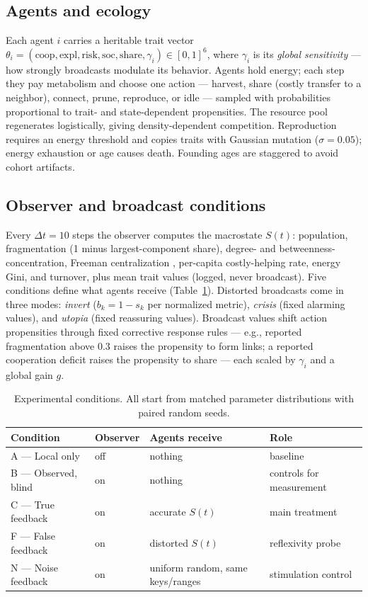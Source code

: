 \documentclass[10pt]{article}
\begin{document}
\subsection{Agents and ecology}
Each agent $i$ carries a heritable trait vector
$\theta_i=(\mathrm{coop},\mathrm{expl},\mathrm{risk},\mathrm{soc},
\mathrm{share},\gamma_i)\in[0,1]^6$, where $\gamma_i$ is its
\emph{global sensitivity} --- how strongly broadcasts modulate its behavior.
Agents hold energy; each step they pay metabolism and choose one action ---
harvest, share (costly transfer to a neighbor), connect, prune, reproduce, or
idle --- sampled with probabilities proportional to trait- and state-dependent
propensities. The resource pool regenerates logistically, giving
density-dependent competition. Reproduction requires an energy threshold and
copies traits with Gaussian mutation ($\sigma=0.05$); energy exhaustion or age
causes death. Founding ages are staggered to avoid cohort artifacts.

\subsection{Observer and broadcast conditions}
Every $\Delta t=10$ steps the observer computes the macrostate $S(t)$:
population, fragmentation (1 minus largest-component share), degree- and
betweenness-concentration, Freeman centralization \cite{freeman1978centrality},
per-capita costly-helping rate, energy Gini, and turnover, plus mean trait
values (logged, never broadcast). Five conditions define what agents receive
(Table~\ref{tab:conditions}). Distorted broadcasts come in three modes:
\emph{invert} ($b_k = 1-s_k$ per normalized metric), \emph{crisis} (fixed
alarming values), and \emph{utopia} (fixed reassuring values). Broadcast
values shift action propensities through fixed corrective response rules ---
e.g., reported fragmentation above $0.3$ raises the propensity to form links;
a reported cooperation deficit raises the propensity to share --- each scaled
by $\gamma_i$ and a global gain $g$.

\begin{table}[t]
\centering\footnotesize
\caption{Experimental conditions. All start from matched parameter
distributions with paired random seeds.}
\label{tab:conditions}
\begin{tabular}{llll}
\toprule
Condition & Observer & Agents receive & Role\\
\midrule
A --- Local only & off & nothing & baseline\\
B --- Observed, blind & on & nothing & controls for measurement\\
C --- True feedback & on & accurate $S(t)$ & main treatment\\
F --- False feedback & on & distorted $S(t)$ & reflexivity probe\\
N --- Noise feedback & on & uniform random, same keys/ranges & stimulation control\\
\bottomrule
\end{tabular}
\end{table}
\end{document}
